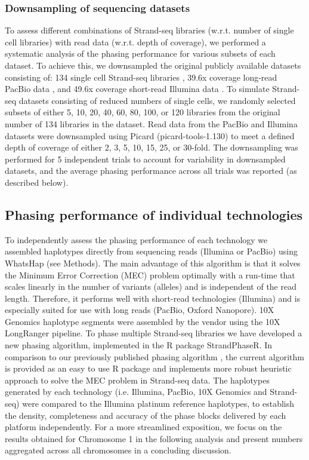 \subsubsection{Downsampling of sequencing datasets}
	To assess different combinations of Strand-seq libraries (w.r.t. number of single cell libraries) with read data (w.r.t. depth of coverage), 
	we performed a systematic analysis of the phasing performance for various subsets of each dataset. 
	To achieve this, we downsampled the  original publicly available datasets consisting of: 134 single cell Strand-seq libraries \citep{Porubsky2016}, 
	39.6x coverage long-read PacBio data \citep{giab}, and 49.6x coverage short-read Illumina data \citep{sudmant2015integrated, 10002015global}. 
	To simulate Strand-seq datasets consisting of reduced numbers of single cells, we randomly selected subsets of either 5, 10, 20, 40, 60, 80, 100, or 120 libraries from the original number of 134  libraries in the dataset. 
	Read data from the PacBio and Illumina datasets were downsampled using Picard (picard-tools-1.130) to meet a defined depth of coverage of either 2, 3, 5, 10, 15, 25, or 30-fold. 
	The downsampling was performed for 5 independent trials to account for variability in downsampled datasets, and the average phasing performance across all trials was reported (as described below).

\subsection{Phasing performance of individual technologies}
	To independently assess the phasing performance of each technology we assembled haplotypes directly from sequencing reads (Illumina or PacBio) using WhatsHap (see Methods). 
	The main advantage of this algorithm is that it solves the Minimum Error Correction (MEC) problem optimally with a run-time that scales linearly in the number of variants (alleles) and is independent of the read length. 
	Therefore, it performs well with short-read technologies (Illumina) and is especially suited for use with long reads (PacBio, Oxford Nanopore). 10X Genomics haplotype segments were assembled by the vendor using the 10X LongRanger pipeline. 
	To phase multiple Strand-seq libraries we have developed a new phasing algorithm, implemented in the R package StrandPhaseR.
	In comparison to our previously published phasing algorithm \citep{Porubsky2016}, the current algorithm is provided as an easy to use R package and implements more robust heuristic approach to solve the MEC problem in Strand-seq data.
	The haplotypes generated by each technology (i.e. Illumina, PacBio, 10X Genomics and Strand-seq) were compared to the Illumina platinum reference haplotypes, to establish the density, completeness and accuracy of the phase blocks delivered by each platform independently. 
	For a more streamlined exposition, we focus on the results obtained for Chromosome 1 in the following analysis and present numbers aggregated across all chromosomes in a concluding discussion.	
	
